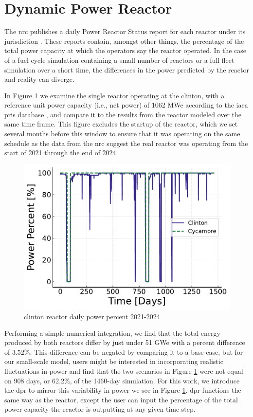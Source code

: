 \section{Dynamic Power Reactor}
\label{sec:dpr_method}

The \gls{nrc} publishes a daily Power Reactor Status report for each reactor
under its jurisdiction \cite{nrc_power_2025}. These reports contain, amongst
other things, the percentage of the total power capacity at which the operators
say the reactor operated. In the case of a fuel cycle simulation containing a
small number of reactors or a full fleet simulation over a short time, the
differences in the power predicted by the \cycamore reactor and reality can
diverge.

In Figure \ref{fig:pp_full} we examine the single reactor operating at the
\gls{clinton}, with a reference unit power capacity (i.e., net power) of 1062
MWe according to the \gls{iaea} \gls{pris} database \cite{IAEA_PRIS}, and
compare it to the results from the \cycamore reactor modeled over the same time
frame. This figure excludes the startup of the \cycamore reactor, which we set
several months before this window to ensure that it was operating on the same
schedule as the data from the \gls{nrc} suggest the real reactor was operating
from the start of 2021 through the end of 2024.

\begin{figure}[H]
  \centering
  \includegraphics[width=0.7\linewidth]{images/power_reactor/power_percent_clinton_fake.pdf}
  \caption{\gls{clinton} reactor daily power percent 2021-2024}
  \label{fig:pp_full}
\end{figure}

Performing a simple numerical integration, we find that the total energy
produced by both reactors differ by just under 51 GWe with a percent difference
of 3.52\%. This difference can be negated by comparing it to a base case, but
for our small-scale model, users might be interested in incorporating realistic
fluctuations in power and find that the two scenarios in Figure
\ref{fig:pp_full} were not equal on 908 days, or 62.2\%, of the 1460-day
simulation. For this work, we introduce the \gls{dpr} to mirror this
variability in power we see in Figure \ref{fig:pp_full}. \gls{dpr} functions
the same way as the \cycamore reactor, except the user can input the percentage
of the total power capacity the reactor is outputting at any given time step.


